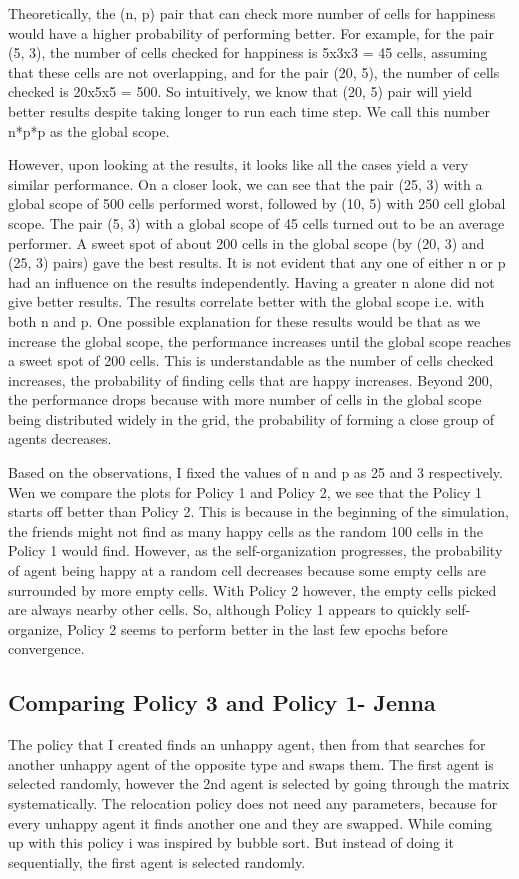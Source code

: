 \documentclass[a4paper,12pt]{article}
\begin{document}
  Theoretically, the (n, p) pair that can check more number of cells for happiness would have a higher probability of performing better. For example, for the pair (5, 3), the number of cells checked for happiness is 5x3x3 = 45 cells, assuming that these cells are not overlapping, and for the pair (20, 5), the number of cells checked is 20x5x5 = 500. So intuitively, we know that (20, 5) pair will yield better results despite taking longer to run each time step. We call this number n*p*p as the global scope.

  However, upon looking at the results, it looks like all the cases yield a very similar performance. On a closer look, we can see that the pair (25, 3) with a global scope of 500 cells performed worst, followed by (10, 5) with 250 cell global scope. The pair (5, 3) with a global scope of 45 cells turned out to be an average performer. A sweet spot of about 200 cells in the global scope (by (20, 3) and (25, 3) pairs) gave the best results.
  It is not evident that any one of either n or p had an influence on the results independently. Having a greater n alone did not give better results. The results correlate better with the global scope i.e. with both n and p.
  One possible explanation for these results would be that as we increase the global scope, the performance increases until the global scope reaches a sweet spot of 200 cells. This is understandable as the number of cells checked increases, the probability of finding cells that are happy increases. Beyond 200, the performance drops because with more number of cells in the global scope being distributed widely in the grid, the probability of forming a close group of agents decreases.

  Based on the observations, I fixed the values of n and p as 25 and 3 respectively. Wen we compare the plots for Policy 1 and Policy 2, we see that the Policy 1 starts off better than Policy 2. This is because in the beginning of the simulation, the friends might not find as many happy cells as the random 100 cells in the Policy 1 would find. However, as the self-organization progresses, the probability of agent being happy at a random cell decreases because some empty cells are surrounded by more empty cells. With Policy 2 however, the empty cells picked are always nearby other cells. So, although Policy 1 appears to quickly self-organize, Policy 2 seems to perform better in the last few epochs before convergence.


  \newpage
  \subsection{Comparing Policy 3 and Policy 1- Jenna}
  The policy that I created finds an unhappy agent, then from that searches for another unhappy agent of the opposite type and swaps them. The first agent is selected randomly, however the 2nd agent is selected by going through the matrix systematically. The relocation policy does not need any parameters, because for every unhappy agent it finds another one and they are swapped. While coming up with this policy i was inspired by bubble sort. But instead of doing it sequentially, the first agent is selected randomly.
\end{document}
